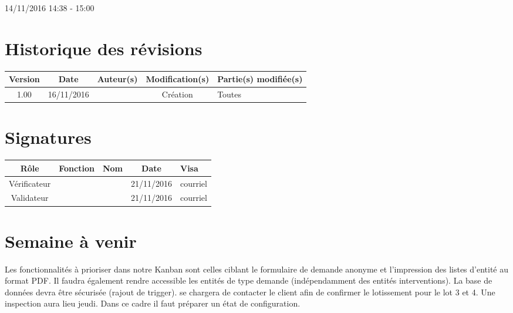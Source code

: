 \documentclass [a4paper] {article}
\begin{document}
14/11/2016			 				%
\hfill   
\hfill 	 14:38 - 15:00				%



\section*{Historique des révisions}
\begin{center}
			\begin{tabular}{| c | c | c | c | p{4cm} |}
				\hline
				\rowcolor{Gray}
				Version & Date & Auteur(s) & Modification(s) & Partie(s) modifiée(s)		 \\
				\hline
				1.00 & 16/11/2016 & \Kafui & Création & Toutes \\
		\hline		
			\end{tabular}
		\end{center}

\section*{Signatures}

		\begin{center}
			\begin{tabular}{| c | c | c | c | p{4cm} |}
				\hline
				\rowcolor{Gray}
				Rôle & Fonction & Nom & Date & Visa		 \\
				\hline
				Vérificateur & \RQ & \Melissa & 21/11/2016 & courriel \\[30pt]
				\hline
				Validateur & \CP & \Pierre & 21/11/2016 & courriel \\[30pt]	
				\hline
			\end{tabular}
		\end{center}

\section{Semaine à venir}
Les fonctionnalités à prioriser dans notre Kanban sont celles ciblant le formulaire de demande anonyme et l'impression des listes d'entité au format PDF. Il faudra également rendre accessible les entités de type demande (indépendamment des entités interventions).
La base de données devra être sécurisée (rajout de trigger).
\Pierre{} se chargera de contacter le client afin de confirmer le lotissement pour le lot 3 et 4.
Une inspection aura lieu jeudi. Dans ce cadre il faut préparer un état de configuration.



\end{document}
